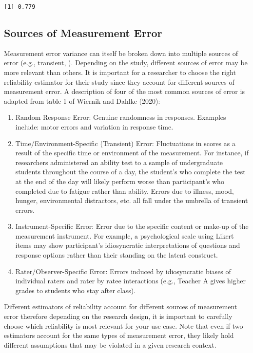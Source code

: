\documentclass[
  letterpaper,
  DIV=11,
  numbers=noendperiod]{scrreprt}
\begin{document}
\begin{verbatim}
[1] 0.779
\end{verbatim}

\hypertarget{sec-sources}{%
\subsection{Sources of Measurement Error}\label{sec-sources}}

Measurement error variance can itself be broken down into multiple
sources of error (e.g., transient, ). Depending on the study, different
sources of error may be more relevant than others. It is important for a
researcher to choose the right reliability estimator for their study
since they account for different sources of measurement error. A
description of four of the most common sources of error is adapted from
table 1 of Wiernik and Dahlke (2020):

\begin{enumerate}
\def\labelenumi{\arabic{enumi}.}
\item
  Random Response Error: Genuine randomness in responses. Examples
  include: motor errors and variation in response time.
\item
  Time/Environment-Specific (Transient) Error: Fluctuations in scores as
  a result of the specific time or environment of the measurement. For
  instance, if researchers administered an ability test to a sample of
  undergraduate students throughout the course of a day, the student's
  who complete the test at the end of the day will likely perform worse
  than participant's who completed due to fatigue rather than ability.
  Errors due to illness, mood, hunger, environmental distractors, etc.
  all fall under the umbrella of transient errors.
\item
  Instrument-Specific Error: Error due to the specific content or
  make-up of the measurement instrument. For example, a psychological
  scale using Likert items may show participant's idiosyncratic
  interpretations of questions and response options rather than their
  standing on the latent construct.
\item
  Rater/Observer-Specific Error: Errors induced by idiosyncratic biases
  of individual raters and rater by ratee interactions (e.g., Teacher A
  gives higher grades to students who stay after class).
\end{enumerate}

Different estimators of reliability account for different sources of
measurement error therefore depending on the research design, it is
important to carefully choose which reliability is most relevant for
your use case. Note that even if two estimators account for the same
types of measurement error, they likely hold different assumptions that
may be violated in a given research context.
\end{document}
